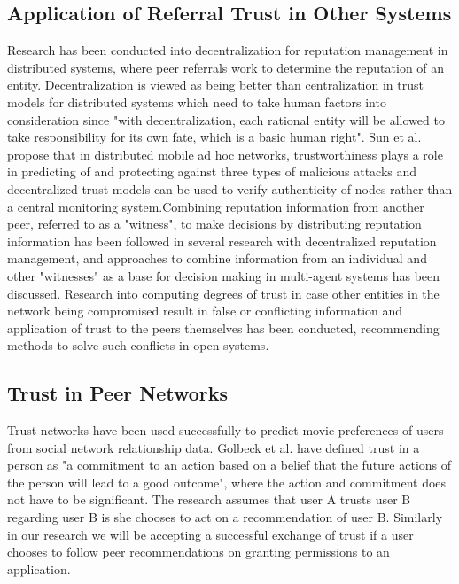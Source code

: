 \subsection{Application of Referral Trust in Other Systems}
Research has been conducted into decentralization for reputation management in distributed systems, where peer referrals work to determine the reputation of an entity. Decentralization is viewed as being better than centralization in trust models for distributed systems which need to take human factors into consideration since "with decentralization, each rational entity will be allowed to take responsibility for its own fate, which is a basic human right"\cite{abdul1997using}. Sun et al. propose that in distributed mobile ad hoc networks, trustworthiness plays a role in predicting of and protecting against three types of malicious attacks and decentralized trust models can be used to verify authenticity of nodes rather than a central monitoring system\cite{sun2008defense}.Combining reputation information from another peer, referred to as a "witness"\cite{yu2000social}\cite{yu2002evidential}, to make decisions by distributing reputation information has been followed in several research with decentralized reputation management, and approaches to combine information from an individual and other "witnesses" as a base for decision making in multi-agent systems has been discussed\cite{sabater2002reputation}. Research into computing degrees of trust in case other entities in the network being compromised result in false or conflicting information and application of trust to the peers themselves has been conducted, recommending methods to solve such conflicts in open systems\cite{beth1994valuation}.

\subsection{Trust in Peer Networks}
Trust networks have been used successfully to predict movie preferences of users from social network relationship data\cite{golbeck2006generating}. Golbeck et al. have defined trust in a person as "a commitment to an action based on a belief that the future actions of the person will lead to a good outcome", where the action and commitment does not have to be significant. The research assumes that user A trusts user B regarding user B is she chooses to act on a recommendation of user B. Similarly in our research we will be accepting a successful exchange of trust if a user chooses to follow peer recommendations on granting permissions to an application. 
\smallskip

